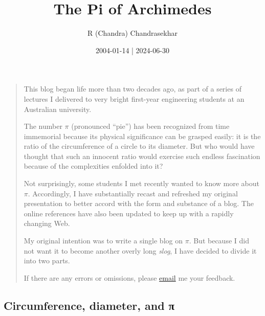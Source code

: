 \documentclass[
  a4paper,
]{article}
\title{The Pi of Archimedes}
\author{R (Chandra) Chandrasekhar}
\date{2004-01-14 | 2024-06-30}
\begin{document}
\maketitle

\thispagestyle{empty}


\begin{quote}
This blog began life more than two decades ago, as part of a series of
lectures I delivered to very bright first-year engineering students at
an Australian university.

The number \(\pi\) (pronounced ``pie'') has been recognized from time
immemorial because its physical significance can be grasped easily: it
is the ratio of the circumference of a circle to its diameter. But who
would have thought that such an innocent ratio would exercise such
endless fascination because of the complexities enfolded into it?

Not surprisingly, some students I met recently wanted to know more about
\(\pi\). Accordingly, I have substantially recast and refreshed my
original presentation to better accord with the form and substance of a
blog. The online references have also been updated to keep up with a
rapidly changing Web.

My original intention was to write a single blog on \(\pi\). But because
I did not want it to become another overly long \emph{slog}, I have
decided to divide it into two parts.

If there are any errors or omissions, please
\href{mailto:feedback.swanlotus@gmail.com}{email} me your feedback.
\end{quote}

\subsection{Circumference, diameter, and
π}\label{circumference-diameter-and-ux3c0}
\end{document}
